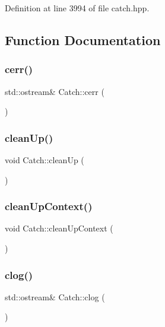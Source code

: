 Definition at line 3994 of file catch.\+hpp.



\subsection{Function Documentation}
\mbox{\label{namespace_catch_a4e5b5dc07abdfa30de33593dfab71f43}} 
\subsubsection{cerr()}
{\footnotesize\ttfamily std\+::ostream\& Catch\+::cerr (\begin{DoxyParamCaption}{ }\end{DoxyParamCaption})}

\mbox{\label{namespace_catch_a0f78e9afdebc6d4512d18e76fbf54b8c}} 
\subsubsection{cleanUp()}
{\footnotesize\ttfamily void Catch\+::clean\+Up (\begin{DoxyParamCaption}{ }\end{DoxyParamCaption})}

\mbox{\label{namespace_catch_ae50508f10ffc4ed873a31a4db4caea16}} 
\subsubsection{cleanUpContext()}
{\footnotesize\ttfamily void Catch\+::clean\+Up\+Context (\begin{DoxyParamCaption}{ }\end{DoxyParamCaption})}

\mbox{\label{namespace_catch_a5a0677089050dcdb4848f56fb47e9279}} 
\subsubsection{clog()}
{\footnotesize\ttfamily std\+::ostream\& Catch\+::clog (\begin{DoxyParamCaption}{ }\end{DoxyParamCaption})}

\mbox{\label{namespace_catch_af89b8df30cfaf09abd048c6ff67359ee}} 

